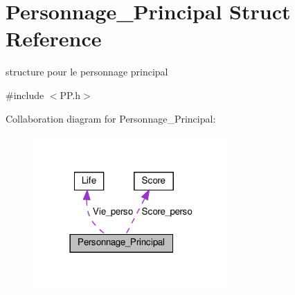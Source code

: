 \hypertarget{structPersonnage__Principal}{}\section{Personnage\+\_\+\+Principal Struct Reference}
\label{structPersonnage__Principal}


structure pour le personnage principal  




{\ttfamily \#include $<$P\+P.\+h$>$}



Collaboration diagram for Personnage\+\_\+\+Principal\+:\nopagebreak
\begin{figure}[H]
\begin{center}
\leavevmode
\includegraphics[width=213pt]{structPersonnage__Principal__coll__graph}
\end{center}
\end{figure}
